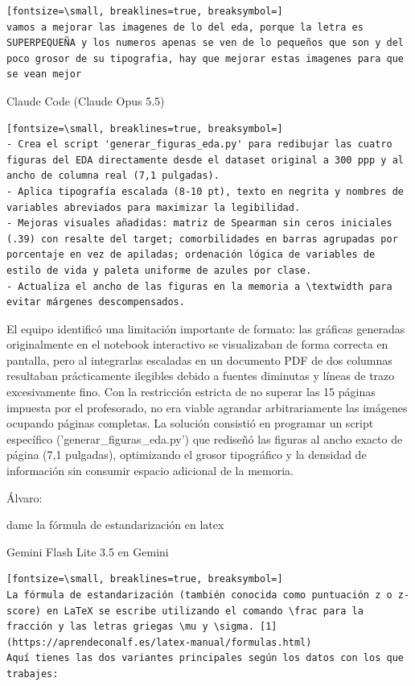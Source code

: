 \documentclass[12pt,a4paper,oneside]{book}
\begin{document}
\begin{iaprompt}
\begin{iaprompt}
\begin{Verbatim}[fontsize=\small, breaklines=true, breaksymbol=]
vamos a mejorar las imagenes de lo del eda, porque la letra es SUPERPEQUEÑA y los numeros apenas se ven de lo pequeños que son y del poco grosor de su tipografia, hay que mejorar estas imagenes para que se vean mejor
\end{Verbatim}
\end{iaprompt}
\begin{iaresp}{Claude Code (Claude Opus 5.5)}
\begin{Verbatim}[fontsize=\small, breaklines=true, breaksymbol=]
- Crea el script 'generar_figuras_eda.py' para redibujar las cuatro figuras del EDA directamente desde el dataset original a 300 ppp y al ancho de columna real (7,1 pulgadas).
- Aplica tipografía escalada (8-10 pt), texto en negrita y nombres de variables abreviados para maximizar la legibilidad.
- Mejoras visuales añadidas: matriz de Spearman sin ceros iniciales (.39) con resalte del target; comorbilidades en barras agrupadas por porcentaje en vez de apiladas; ordenación lógica de variables de estilo de vida y paleta uniforme de azules por clase.
- Actualiza el ancho de las figuras en la memoria a \textwidth para evitar márgenes descompensados.
\end{Verbatim}
\end{iaresp}
\begin{iaanalisis}
El equipo identificó una limitación importante de formato: las gráficas generadas originalmente en el notebook interactivo se visualizaban de forma correcta en pantalla, pero al integrarlas escaladas en un documento PDF de dos columnas resultaban prácticamente ilegibles debido a fuentes diminutas y líneas de trazo excesivamente fino. Con la restricción estricta de no superar las 15 páginas impuesta por el profesorado, no era viable agrandar arbitrariamente las imágenes ocupando páginas completas. La solución consistió en programar un script específico ('generar_figuras_eda.py') que rediseñó las figuras al ancho exacto de página (7,1 pulgadas), optimizando el grosor tipográfico y la densidad de información sin consumir espacio adicional de la memoria.
\end{iaanalisis}


Álvaro:
\begin{iaprompt}
dame la fórmula de estandarización en latex
\end{iaprompt}
\begin{iaresp}{Gemini Flash Lite 3.5 en Gemini}
\begin{Verbatim}[fontsize=\small, breaklines=true, breaksymbol=]
La fórmula de estandarización (también conocida como puntuación z o z-score) en LaTeX se escribe utilizando el comando \frac para la fracción y las letras griegas \mu y \sigma. [1] (https://aprendeconalf.es/latex-manual/formulas.html)
Aquí tienes las dos variantes principales según los datos con los que trabajes:


\end{Verbatim}
\end{iaresp}
\end{iaprompt}
\end{document}
